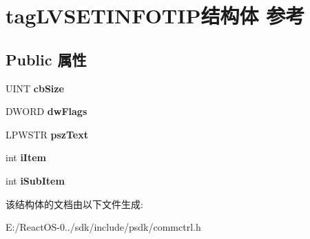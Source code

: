 \hypertarget{structtag_l_v_s_e_t_i_n_f_o_t_i_p}{}\section{tag\+L\+V\+S\+E\+T\+I\+N\+F\+O\+T\+I\+P结构体 参考}
\label{structtag_l_v_s_e_t_i_n_f_o_t_i_p}
\subsection*{Public 属性}
\begin{DoxyCompactItemize}
\item 
\mbox{\label{structtag_l_v_s_e_t_i_n_f_o_t_i_p_a91eb1afecc442575846b746883e2dd8d}} 
U\+I\+NT {\bfseries cb\+Size}
\item 
\mbox{\label{structtag_l_v_s_e_t_i_n_f_o_t_i_p_a1a98e2e3cc523c1ab3ee8fd705e27523}} 
D\+W\+O\+RD {\bfseries dw\+Flags}
\item 
\mbox{\label{structtag_l_v_s_e_t_i_n_f_o_t_i_p_acc2c43feae88bd9d00f41c92a6f5e23c}} 
L\+P\+W\+S\+TR {\bfseries psz\+Text}
\item 
\mbox{\label{structtag_l_v_s_e_t_i_n_f_o_t_i_p_ac0e3c4113dd7319d3125c92540ef59cb}} 
int {\bfseries i\+Item}
\item 
\mbox{\label{structtag_l_v_s_e_t_i_n_f_o_t_i_p_a795ccc0a3c97c12080e876a930c919f1}} 
int {\bfseries i\+Sub\+Item}
\end{DoxyCompactItemize}


该结构体的文档由以下文件生成\+:\begin{DoxyCompactItemize}
\item 
E\+:/\+React\+O\+S-\/0../sdk/include/psdk/commctrl.\+h\end{DoxyCompactItemize}
